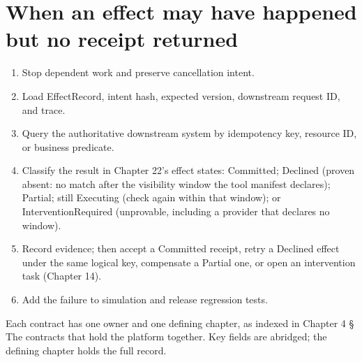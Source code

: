 \section{When an effect may have happened but no receipt returned}

\begin{enumerate}

\item Stop dependent work and preserve cancellation intent.

\item Load EffectRecord, intent hash, expected version, downstream request ID, and trace.

\item Query the authoritative downstream system by idempotency key, resource ID, or business predicate.

\item Classify the result in Chapter 22's effect states: Committed; Declined (proven absent: no match after the visibility window the tool manifest declares); Partial; still Executing (check again within that window); or InterventionRequired (unprovable, including a provider that declares no window).

\item Record evidence; then accept a Committed receipt, retry a Declined effect under the same logical key, compensate a Partial one, or open an intervention task (Chapter 14).

\item Add the failure to simulation and release regression tests.

\end{enumerate}


Each contract has one owner and one defining chapter, as indexed in Chapter 4 § The contracts that hold the platform together. Key fields are abridged; the defining chapter holds the full record.\par

